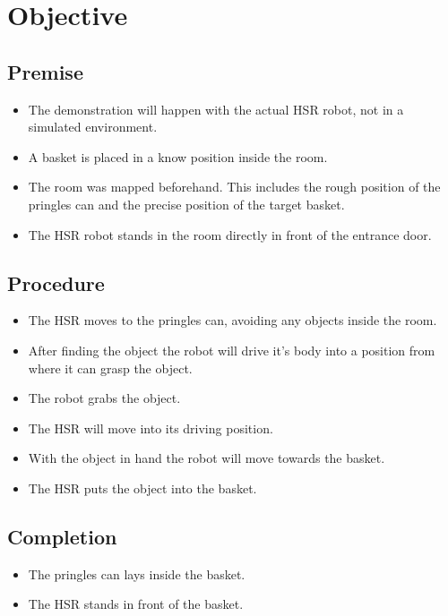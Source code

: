 \documentclass[main.tex]{subfiles}
\begin{document}
	
	\chapter{Objective}
	\section{Premise}
		\begin{itemize}
			\item The demonstration will happen with the actual HSR robot, not in a simulated environment.
			\item A basket is placed in a know position inside the room.
			\item The room was mapped beforehand. This includes the rough position of the pringles can and the precise position of the target basket.
			\item The HSR robot stands in the room directly in front of the entrance door.
		\end{itemize} 
		
	\section{Procedure}
		\begin{itemize}			
			\item The HSR moves to the pringles can, avoiding any objects inside the room.
			\item After finding the object the robot will drive it's body into a position from where it can grasp the object.
			\item The robot grabs the object.
			\item The HSR will move into its driving position.
			\item With the object in hand the robot will move towards the basket.
			\item The HSR puts the object into the basket.			
		\end{itemize}
	
	\section{Completion}
	\begin{itemize}
		\item The pringles can lays inside the basket.
		\item The HSR stands in front of the basket.
	\end{itemize}
\end{document}
